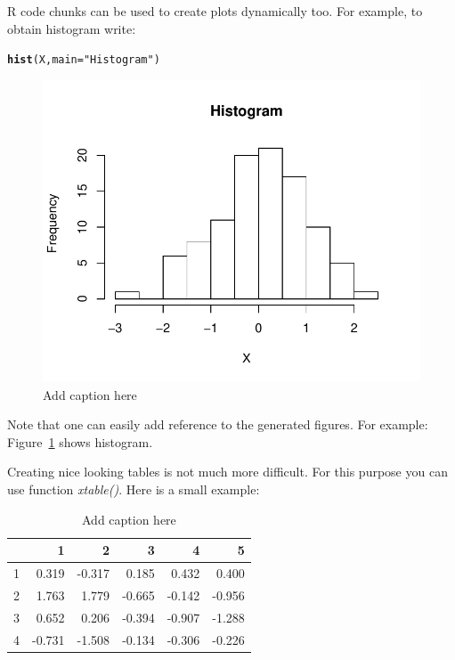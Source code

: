 \documentclass[12pt, a4paper]{article}\usepackage[]{graphicx}\usepackage[]{color}
\makeatletter
\def\maxwidth{ %
  \ifdim\Gin@nat@width>\linewidth
    \linewidth
  \else
    \Gin@nat@width
  \fi
}
\newcommand{\hlstr}[1]{\textcolor[rgb]{0.192,0.494,0.8}{#1}}%
\newcommand{\hlstd}[1]{\textcolor[rgb]{0.345,0.345,0.345}{#1}}%
\newcommand{\hlkwc}[1]{\textcolor[rgb]{0.333,0.667,0.333}{#1}}%
\newcommand{\hlkwd}[1]{\textcolor[rgb]{0.737,0.353,0.396}{\textbf{#1}}}%
\newenvironment{kframe}{%
 \def\at@end@of@kframe{}%
 \ifinner\ifhmode%
  \def\at@end@of@kframe{\end{minipage}}%
  \begin{minipage}{\columnwidth}%
 \fi\fi%
 \def\FrameCommand##1{\hskip\@totalleftmargin \hskip-\fboxsep
 \colorbox{shadecolor}{##1}\hskip-\fboxsep
     \hskip-\linewidth \hskip-\@totalleftmargin \hskip\columnwidth}%
 \MakeFramed {\advance\hsize-\width
   \@totalleftmargin\z@ \linewidth\hsize
   \@setminipage}}%
 {\par\unskip\endMakeFramed%
 \at@end@of@kframe}
\newenvironment{knitrout}{}{} %
\makeatother
\begin{document}
R code chunks can  be used to create plots dynamically too.
For example,  to obtain histogram write:
\begin{knitrout}
\color{fgcolor}\begin{kframe}
\begin{alltt}
\hlkwd{hist}\hlstd{(X,} \hlkwc{main}\hlstd{=}\hlstr{"Histogram"}\hlstd{)}
\end{alltt}
\end{kframe}\begin{figure}[H]

{\centering \includegraphics[width=\maxwidth]{figure/example_hist-1} 

}

\caption[Add caption here]{Add caption here}\label{fig:example_hist}
\end{figure}


\end{knitrout}
Note that one can easily add  reference to the generated figures.  For example: Figure~\ref{fig:example_hist} shows histogram.


Creating nice looking tables is not much more difficult. For this purpose you can use
function {\em xtable()}. Here is a small example:
\begin{table}[H]
\centering
\begin{tabular}{rrrrrr}
  \hline
 & 1 & 2 & 3 & 4 & 5 \\ 
  \hline
1 & 0.319 & -0.317 & 0.185 & 0.432 & 0.400 \\ 
  2 & 1.763 & 1.779 & -0.665 & -0.142 & -0.956 \\ 
  3 & 0.652 & 0.206 & -0.394 & -0.907 & -1.288 \\ 
  4 & -0.731 & -1.508 & -0.134 & -0.306 & -0.226 \\ 
   \hline
\end{tabular}
\caption{Add caption here} 
\label{tab:table1}
\end{table}
\end{document}
